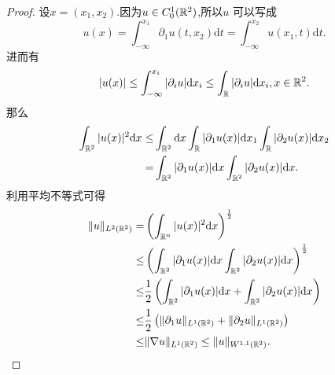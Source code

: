 \begin{proof}
  设$x=(x_1,x_2)$.因为$u\in C^{1}_0(\mathbb{R}^2)$,所以$u$ 可以写成
  \[
    u(x)=\int_{-\infty}^{x_1}\partial_1 u(t,x_2)\mathrm{d}t=\int_{-\infty}^{x_2}u(x_1,t)\mathrm{d}t.
  \] 
  进而有
  \[
    |u(x)|\le \int_{-\infty}^{x_i}|\partial_{i}u|\mathrm{d}x_i\le \int_{\mathbb{R}}|\partial_i u|\mathrm{d}x_i, x\in \mathbb{R}^2
  .\]
  那么
  \begin{align*}
    \int_{\mathbb{R}^2}|u(x)|^2\mathrm{d}x\le& \int_{\mathbb{R}^2}\mathrm{d}x\int_{\mathbb{R}}|\partial_1 u(x)|\mathrm{d}x_1\int_{\mathbb{R}} |\partial_2u(x)|\mathrm{d}x_2\\
    =&\int_{\mathbb{R}^2}|\partial_1 u(x)|\mathrm{d}x \int_{\mathbb{R}^2}|\partial_2 u(x)|\mathrm{d}x
  .\end{align*}
  利用平均不等式可得
  \begin{align*}
    \|u\|_{L^2(\mathbb{R}^2)}=&\left( \int_{\mathbb{R}^{n}}|u(x)|^2\mathrm{d}x \right) ^{\frac{1}{2}}\\
    \le& \left( \int_{\mathbb{R}^2}|\partial_1 u(x)|\mathrm{d}x \int_{\mathbb{R}^2}|\partial_2u(x)|\mathrm{d}x \right) ^{\frac{1}{2}}\\
    \le&\frac{1}{2}\left( \int_{\mathbb{R}^2}|\partial_1u(x)|\mathrm{d}x+\int_{\mathbb{R}^2}|\partial_2u(x)|\mathrm{d}x \right)\\
    \le &\frac{1}{2}\left( \|\partial_1u\|_{L^{1}(\mathbb{R}^2)}+\|\partial_2 u\|_{L^{1}(\mathbb{R}^2)}\right)\\
    \le  & \|\nabla  u\|_{L^{1}(\mathbb{R}^2)}\le \|u\|_{W^{1,1}(\mathbb{R}^2)}
  .\end{align*}
\end{proof}
